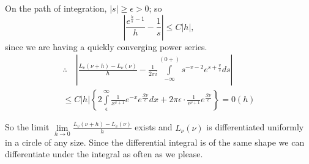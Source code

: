 On the path of integration, $|s| \geq \epsilon > 0$; so
$$
\left| \frac{e^{\frac{h}{s}-1}}{h} - \frac{1}{s}\right|\leq C |h|,
$$
since we are having a quickly converging power series.
\begin{multline*}
  \therefore \quad \left| \frac{L_\nu (\nu +h)- L_\nu (\nu)}{h}-
  \frac{1}{2 \pi i} \int\limits^{(0+)}_{- \infty} s^{- v-2} e^{s+
    \frac{v}{s}} ds \right|\\
  \leq C|h| \left\{ 2 \int\limits^\infty_\epsilon \frac{1}{x^{v+1}} e^{-x}
  e^{\frac{\mathscr{R} \nu}{\epsilon}} dx + 2 \pi \epsilon \cdot
  \frac{1}{e^{\nu+1}} e^{\frac{\mathscr{R}\nu}{\epsilon}} \right\}  = 0(h) 
\end{multline*}

So the limit $\lim\limits_{h \to 0} \frac{L_v (\nu+h)- L_v(\nu)}{h}$
exists and $L_\nu (\nu)$ is differentiated uniformly in a circle of
any size. Since the differential integral is of the same shape we can
differentiate  under the integral as often as we please.

